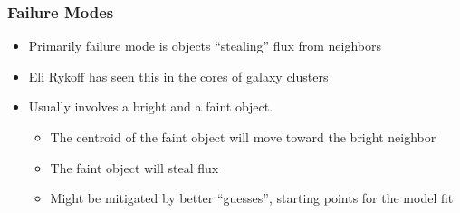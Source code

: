 \documentclass{beamer}
\begin{document}
\frame
{

    \frametitle{Failure Modes}


    \begin{itemize}

        \item Primarily failure mode is objects ``stealing'' flux from neighbors

        \item Eli Rykoff has seen this in the cores of galaxy clusters

        \item Usually involves a bright and a faint object.
            \begin{itemize}
                \item The centroid of the faint object will move toward the bright neighbor
                \item The faint object will steal flux
                \item Might be mitigated by better ``guesses'', starting points for the
                    model fit
            \end{itemize}

    \end{itemize}

}
\end{document}

